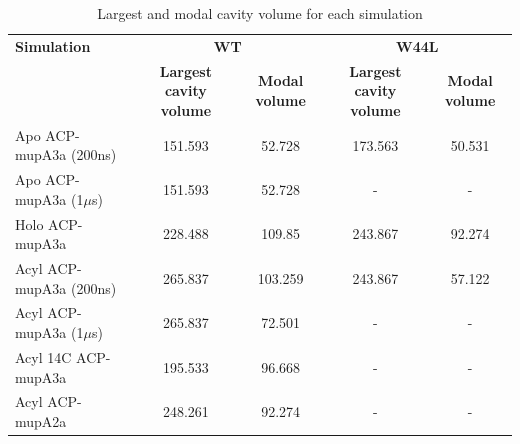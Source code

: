 \newpage			
	\begin{table}[h]
	\caption{Largest and modal cavity volume for each simulation}
	\label{tab:largestcavity}
	\begin{tabular}{p{4cm}|c c|c c}
	\toprule[2pt]
	\textbf{Simulation} & \multicolumn{ 2}{c|}{\textbf{WT}} & \multicolumn{ 2}{c}{\textbf{W44L}} \\ 
	\textbf{} & \multicolumn{1}{p{3cm}}{\textbf{Largest cavity volume}} & \multicolumn{1}{p{2cm}|}{\textbf{Modal volume}} & \multicolumn{1}{p{3cm}}{\textbf{Largest cavity volume}} & \multicolumn{1}{p{2cm}}{\textbf{Modal volume}} \\ 
	\midrule[1pt]
	Apo ACP-mupA3a (200ns) & 151.593 & 52.728 & 173.563 & 50.531 \\ 
	Apo ACP-mupA3a (1$ \mu $s) & 151.593 & 52.728 & - & - \\ 
	Holo ACP-mupA3a & 228.488 & 109.85 & 243.867 & 92.274 \\ 
	Acyl ACP-mupA3a (200ns) & 265.837 & 103.259 & 243.867 & 57.122 \\ 
	Acyl ACP-mupA3a (1$ \mu $s) & 265.837 & 72.501 & - & - \\ 
	Acyl 14C ACP-mupA3a & 195.533 & 96.668 & - & - \\ 
	Acyl ACP-mupA2a & 248.261 & 92.274 & - & - \\ 
	\bottomrule[2pt]
	\end{tabular}
	\end{table}

	
	
\newpage	
